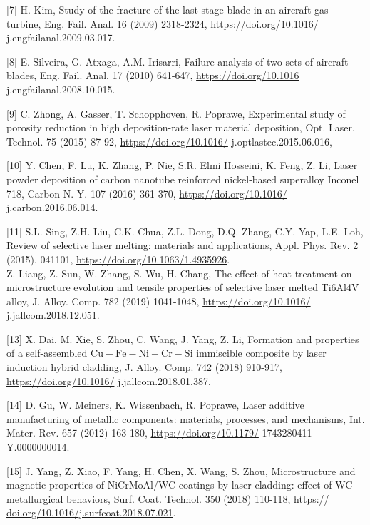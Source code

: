 \documentclass[10pt]{article}
\begin{document}
[7] H. Kim, Study of the fracture of the last stage blade in an aircraft gas turbine, Eng. Fail. Anal. 16 (2009) 2318-2324, \href{https://doi.org/10.1016/}{https://doi.org/10.1016/} j.engfailanal.2009.03.017.

[8] E. Silveira, G. Atxaga, A.M. Irisarri, Failure analysis of two sets of aircraft blades, Eng. Fail. Anal. 17 (2010) 641-647, \href{https://doi.org/10.1016}{https://doi.org/10.1016} j.engfailanal.2008.10.015.

[9] C. Zhong, A. Gasser, T. Schopphoven, R. Poprawe, Experimental study of porosity reduction in high deposition-rate laser material deposition, Opt. Laser. Technol. 75 (2015) 87-92, \href{https://doi.org/10.1016/}{https://doi.org/10.1016/} j.optlastec.2015.06.016,

[10] Y. Chen, F. Lu, K. Zhang, P. Nie, S.R. Elmi Hosseini, K. Feng, Z. Li, Laser powder deposition of carbon nanotube reinforced nickel-based superalloy Inconel 718, Carbon N. Y. 107 (2016) 361-370, \href{https://doi.org/10.1016/}{https://doi.org/10.1016/} j.carbon.2016.06.014.

[11] S.L. Sing, Z.H. Liu, C.K. Chua, Z.L. Dong, D.Q. Zhang, C.Y. Yap, L.E. Loh, Review of selective laser melting: materials and applications, Appl. Phys. Rev. 2 (2015), 041101, \href{https://doi.org/10.1063/1.4935926}{https://doi.org/10.1063/1.4935926}.\\
[12] Z. Liang, Z. Sun, W. Zhang, S. Wu, H. Chang, The effect of heat treatment on microstructure evolution and tensile properties of selective laser melted Ti6Al4V alloy, J. Alloy. Comp. 782 (2019) 1041-1048, \href{https://doi.org/10.1016/}{https://doi.org/10.1016/} j.jallcom.2018.12.051.

[13] X. Dai, M. Xie, S. Zhou, C. Wang, J. Yang, Z. Li, Formation and properties of a self-assembled $\mathrm{Cu}-\mathrm{Fe}-\mathrm{Ni}-\mathrm{Cr}-\mathrm{Si}$ immiscible composite by laser induction hybrid cladding, J. Alloy. Comp. 742 (2018) 910-917, \href{https://doi.org/10.1016/}{https://doi.org/10.1016/} j.jallcom.2018.01.387.

[14] D. Gu, W. Meiners, K. Wissenbach, R. Poprawe, Laser additive manufacturing of metallic components: materials, processes, and mechanisms, Int. Mater. Rev. 657 (2012) 163-180, \href{https://doi.org/10.1179/}{https://doi.org/10.1179/} 1743280411 Y.0000000014.

[15] J. Yang, Z. Xiao, F. Yang, H. Chen, X. Wang, S. Zhou, Microstructure and magnetic properties of NiCrMoAl/WC coatings by laser cladding: effect of WC metallurgical behaviors, Surf. Coat. Technol. 350 (2018) 110-118, https:// \href{http://doi.org/10.1016/j.surfcoat.2018.07.021}{doi.org/10.1016/j.surfcoat.2018.07.021}.
\end{document}
